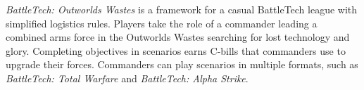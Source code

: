 \emph{BattleTech: Outworlds Wastes} is a framework for a casual BattleTech league with simplified logistics rules.
Players take the role of a commander leading a combined arms force in the Outworlds Wastes searching for lost technology and glory.
Completing objectives in scenarios earns C-bills that commanders use to upgrade their forces.
Commanders can play scenarios in multiple formats, such as \emph{BattleTech: Total Warfare} and \emph{BattleTech: Alpha Strike}.

